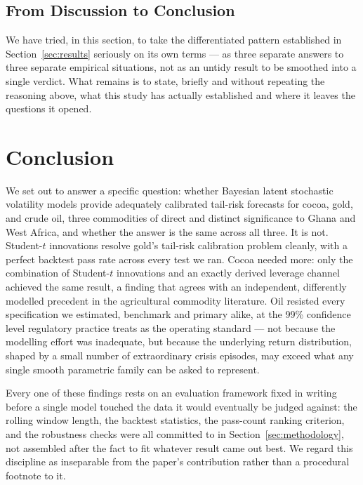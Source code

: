 \documentclass[preprint,12pt,authoryear]{elsarticle}
\begin{document}
\subsection{From Discussion to Conclusion}

We have tried, in this section, to take the differentiated pattern established in Section~\ref{sec:results} seriously on its own terms --- as three separate answers to three separate empirical situations, not as an untidy result to be smoothed into a single verdict. What remains is to state, briefly and without repeating the reasoning above, what this study has actually established and where it leaves the questions it opened.

\section{Conclusion}
\label{sec:conclusion}

We set out to answer a specific question: whether Bayesian latent stochastic volatility models provide adequately calibrated tail-risk forecasts for cocoa, gold, and crude oil, three commodities of direct and distinct significance to Ghana and West Africa, and whether the answer is the same across all three. It is not. Student-$t$ innovations resolve gold's tail-risk calibration problem cleanly, with a perfect backtest pass rate across every test we ran. Cocoa needed more: only the combination of Student-$t$ innovations and an exactly derived leverage channel achieved the same result, a finding that agrees with an independent, differently modelled precedent in the agricultural commodity literature. Oil resisted every specification we estimated, benchmark and primary alike, at the 99\% confidence level regulatory practice treats as the operating standard --- not because the modelling effort was inadequate, but because the underlying return distribution, shaped by a small number of extraordinary crisis episodes, may exceed what any single smooth parametric family can be asked to represent.

Every one of these findings rests on an evaluation framework fixed in writing before a single model touched the data it would eventually be judged against: the rolling window length, the backtest statistics, the pass-count ranking criterion, and the robustness checks were all committed to in Section~\ref{sec:methodology}, not assembled after the fact to fit whatever result came out best. We regard this discipline as inseparable from the paper's contribution rather than a procedural footnote to it.
\end{document}
